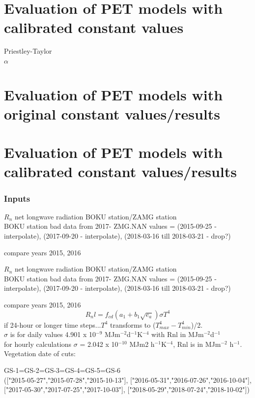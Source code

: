 \documentclass[hydrology,article,submit,moreauthors,pdftex]{Definitions/mdpi}
\begin{document}
\section{Evaluation of PET models with calibrated constant values}

Priestley-Taylor \\
$\alpha$
\\

\section{Evaluation of PET models with original constant values/results}
\section{Evaluation of PET models with calibrated constant values/results}


\subsubsection{Inputs}

$R_n$ net longwave radiation
BOKU station/ZAMG station \\

BOKU station bad data from 2017-
ZMG.NAN values = (2015-09-25 - interpolate), (2017-09-20 - interpolate), (2018-03-16 till 2018-03-21 - drop?)

compare years 2015, 2016

$R_n$ net longwave radiation
BOKU station/ZAMG station \\

BOKU station bad data from 2017-
ZMG.NAN values = (2015-09-25 - interpolate), (2017-09-20 - interpolate), (2018-03-16 till 2018-03-21 - drop?)

compare years 2015, 2016
\begin{equation}
R_nl = f_{cd} (a_1+b_1\sqrt{e_a})\sigma T^4
\end{equation}
if 24-hour or longer time steps...$T^4$ transforms to ($T^4_{max}-T^4_{min}$)/2. \\
$\sigma$ is for daily values 4.901 x 10$^{-9}$ MJm$^{-2}$d$^{-1}$K$^{-4}$ with Rnl in MJm$^{-2}$d$^{-1}$ \\
for hourly calculations $\sigma$ = 2.042 x 10$^{-10}$ MJm2 h$^{-1}$K$^{-4}$, Rnl is in MJm$^{-2}$ h$^{-1}$.
\\
Vegetation
date of cuts:

GS-1=GS-2=GS-3=GS-4=GS-5=GS-6 \\
(["2015-05-27","2015-07-28","2015-10-13"],
["2016-05-31","2016-07-26","2016-10-04"],
["2017-05-30","2017-07-25","2017-10-03"],
["2018-05-29","2018-07-24","2018-10-02"])
\end{document}
